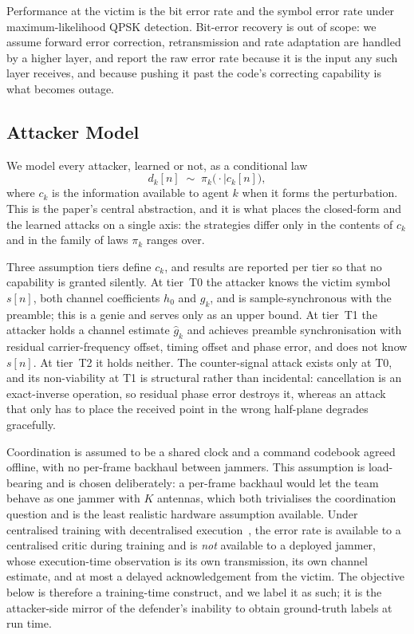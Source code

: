 Performance at the victim is the bit error rate and the symbol error rate under maximum-likelihood QPSK detection.
Bit-error recovery is out of scope: we assume forward error correction, retransmission and rate adaptation are handled by a higher layer, and report the raw error rate because it is the input any such layer receives, and because pushing it past the code's correcting capability is what becomes outage.

\subsection{Attacker Model}
\label{sec:system:attacker}

We model every attacker, learned or not, as a conditional law
\begin{equation}
  d_k[n] \;\sim\; \pi_k\bigl( \cdot \mid c_k[n] \bigr),
  \label{eq:policy}
\end{equation}
where $c_k$ is the information available to agent $k$ when it forms the perturbation.
This is the paper's central abstraction, and it is what places the closed-form and the learned attacks on a single axis: the strategies differ only in the contents of $c_k$ and in the family of laws $\pi_k$ ranges over.

Three assumption tiers define $c_k$, and results are reported per tier so that no capability is granted silently.
At tier~T0 the attacker knows the victim symbol $s[n]$, both channel coefficients $h_0$ and $g_k$, and is sample-synchronous with the preamble; this is a genie and serves only as an upper bound.
At tier~T1 the attacker holds a channel estimate $\hat{g}_k$ and achieves preamble synchronisation with residual carrier-frequency offset, timing offset and phase error, and does not know $s[n]$.
At tier~T2 it holds neither.
The counter-signal attack exists only at T0, and its non-viability at T1 is structural rather than incidental: cancellation is an exact-inverse operation, so residual phase error destroys it, whereas an attack that only has to place the received point in the wrong half-plane degrades gracefully.

Coordination is assumed to be a shared clock and a command codebook agreed offline, with no per-frame backhaul between jammers.
This assumption is load-bearing and is chosen deliberately: a per-frame backhaul would let the team behave as one jammer with $K$ antennas, which both trivialises the coordination question and is the least realistic hardware assumption available.
Under centralised training with decentralised execution~\cite{lowe2017maddpg}, the error rate is available to a centralised critic during training and is \emph{not} available to a deployed jammer, whose execution-time observation is its own transmission, its own channel estimate, and at most a delayed acknowledgement from the victim.
The objective below is therefore a training-time construct, and we label it as such; it is the attacker-side mirror of the defender's inability to obtain ground-truth labels at run time.

